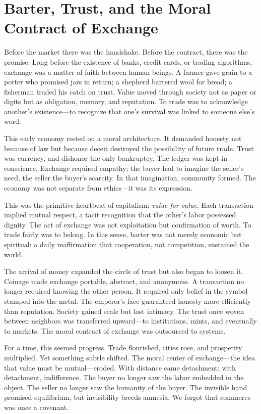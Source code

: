 \documentclass[11pt,twoside]{book}
\begin{document}
\chapter{Barter, Trust, and the Moral Contract of Exchange}
\label{ch:11}

Before the market there was the handshake.  
Before the contract, there was the promise.  Long before the existence of banks, credit cards, or trading algorithms, exchange was a matter of faith between human beings.  A farmer gave grain to a potter who promised jars in return; a shepherd bartered wool for bread; a fisherman traded his catch on trust.  Value moved through society not as paper or digits but as obligation, memory, and reputation.  To trade was to acknowledge another’s existence—to recognize that one’s survival was linked to someone else’s word.

This early economy rested on a moral architecture.  It demanded honesty not because of law but because deceit destroyed the possibility of future trade.  Trust was currency, and dishonor the only bankruptcy.  The ledger was kept in conscience.  Exchange required empathy; the buyer had to imagine the seller’s need, the seller the buyer’s scarcity.  In that imagination, community formed.  The economy was not separate from ethics—it was its expression.

This was the primitive heartbeat of capitalism: \emph{value for value}.  Each transaction implied mutual respect, a tacit recognition that the other’s labor possessed dignity.  The act of exchange was not exploitation but confirmation of worth.  To trade fairly was to belong.  In this sense, barter was not merely economic but spiritual: a daily reaffirmation that cooperation, not competition, sustained the world.  

The arrival of money expanded the circle of trust but also began to loosen it.  Coinage made exchange portable, abstract, and anonymous.  A transaction no longer required knowing the other person.  It required only belief in the symbol stamped into the metal.  The emperor’s face guaranteed honesty more efficiently than reputation.  Society gained scale but lost intimacy.  The trust once woven between neighbors was transferred upward—to institutions, mints, and eventually to markets.  The moral contract of exchange was outsourced to systems.

For a time, this seemed progress.  Trade flourished, cities rose, and prosperity multiplied.  Yet something subtle shifted.  The moral center of exchange—the idea that value must be mutual—eroded.  With distance came detachment; with detachment, indifference.  The buyer no longer saw the labor embedded in the object.  The seller no longer saw the humanity of the buyer.  The invisible hand promised equilibrium, but invisibility breeds amnesia.  We forgot that commerce was once a covenant.
\end{document}
